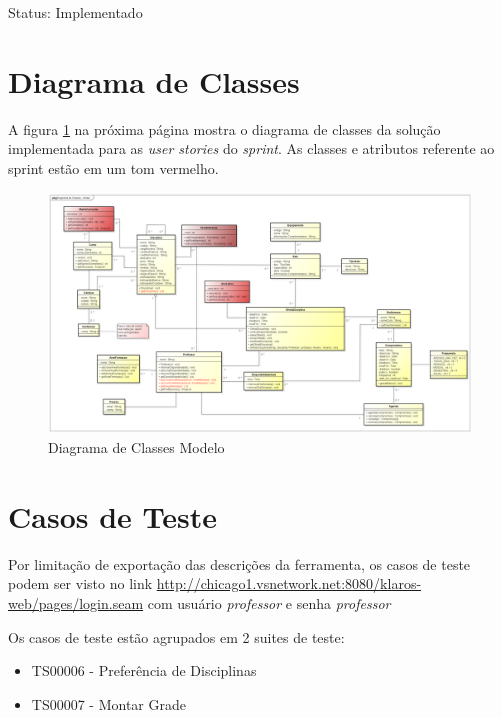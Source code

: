\documentclass{abnt}
\begin{document}
			Status: Implementado
		
	\clearpage
	
		\section{Diagrama de Classes}
		
			A figura \ref{fig:DiagramaClassesModelo} na próxima página mostra o diagrama de classes da solução implementada para as \emph{user stories} do \emph{sprint}. As classes e atributos referente ao sprint estão em um tom vermelho.
			
					 \begin{landscape}
					 			\begin{figure}[htp]
					 				\begin{center}
					 					 \includegraphics[width=600px]{DiagramaClassesModelo}
					 					 \caption{Diagrama de Classes Modelo}
					 					 \label{fig:DiagramaClassesModelo}
					 				\end{center}
					 			\end{figure}
					 		\end{landscape}
			
	
		\section{Casos de Teste}
		
		 Por limitação de exportação das descrições da ferramenta, os casos de teste podem ser visto no link \url{http://chicago1.vsnetwork.net:8080/klaros-web/pages/login.seam} com usuário \emph{professor} e senha \emph{professor}
		 
		 Os casos de teste estão agrupados em 2 suites de teste:
		 \begin{itemize}
		 \item TS00006 - Preferência de Disciplinas
		 \item TS00007 - Montar Grade
		 \end{itemize}
		 
\end{document}
